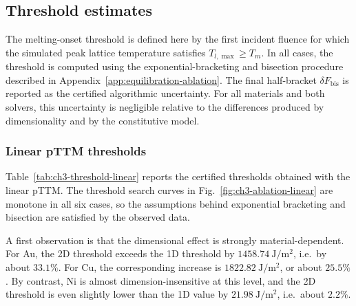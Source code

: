\subsection{Threshold estimates}
\label{sec:ch3-ablation-thresholds}

The melting-onset threshold is defined here by the first incident fluence
for which the simulated peak lattice temperature satisfies
\(T_{l,\max}\ge T_m\). In all cases, the threshold is computed using the
exponential-bracketing and bisection procedure described in
Appendix~\ref{app:equilibration-ablation}. The final half-bracket
\(\delta F_{\mathrm{bis}}\) is reported as the certified algorithmic
uncertainty. For all materials and both solvers, this uncertainty is
negligible relative to the differences produced by dimensionality and by
the constitutive model.

\subsubsection{Linear pTTM thresholds}
\label{sec:ch3-ablation-linear}

Table~\ref{tab:ch3-threshold-linear} reports the certified thresholds
obtained with the linear pTTM. The threshold search curves in
Fig.~\ref{fig:ch3-ablation-linear} are monotone in all six cases, so the
assumptions behind exponential bracketing and bisection are satisfied by
the observed data.

A first observation is that the dimensional effect is strongly
material-dependent. For Au, the 2D threshold exceeds the 1D threshold by
\(\SI{1458.74}{\joule\per\square\metre}\), i.e.\ by about \(33.1\%\).
For Cu, the corresponding increase is
\(\SI{1822.82}{\joule\per\square\metre}\), or about \(25.5\%\).
By contrast, Ni is almost dimension-insensitive at this level, and the 2D
threshold is even slightly lower than the 1D value by
\(\SI{21.98}{\joule\per\square\metre}\), i.e.\ about \(2.2\%\).

